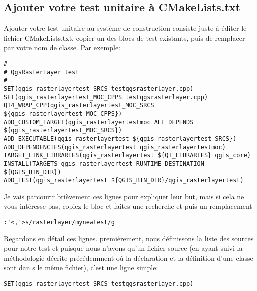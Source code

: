 \subsection{Ajouter votre test unitaire \`a CMakeLists.txt}
Ajouter votre test unitaire au syst\`eme de construction consiste juste \`a \'editer le fichier CMakeLists.txt, copier un des blocs de test existants, puis de remplacer par votre nom de classe. Par exemple:

\begin{verbatim}
#
# QgsRasterLayer test
#
SET(qgis_rasterlayertest_SRCS testqgsrasterlayer.cpp)
SET(qgis_rasterlayertest_MOC_CPPS testqgsrasterlayer.cpp)
QT4_WRAP_CPP(qgis_rasterlayertest_MOC_SRCS ${qgis_rasterlayertest_MOC_CPPS})
ADD_CUSTOM_TARGET(qgis_rasterlayertestmoc ALL DEPENDS ${qgis_rasterlayertest_MOC_SRCS})
ADD_EXECUTABLE(qgis_rasterlayertest ${qgis_rasterlayertest_SRCS})
ADD_DEPENDENCIES(qgis_rasterlayertest qgis_rasterlayertestmoc)
TARGET_LINK_LIBRARIES(qgis_rasterlayertest ${QT_LIBRARIES} qgis_core)
INSTALL(TARGETS qgis_rasterlayertest RUNTIME DESTINATION ${QGIS_BIN_DIR})
ADD_TEST(qgis_rasterlayertest ${QGIS_BIN_DIR}/qgis_rasterlayertest)
\end{verbatim}
Je vais parcourir bri\`evement ces lignes pour expliquer leur but, mais si cela ne vous int\'eresse pas, copiez le bloc et faites une recherche et puis un remplacement

\begin{verbatim}
:'<,'>s/rasterlayer/mynewtest/g
\end{verbatim}

Regardons en d\'etail ces lignes. premi\`erement, nous d\'efinissons la liste des sources pour notre test et puisque nous n'avons qu'un fichier source (en ayant suivi la m\'ethodologie d\'ecrite pr\'ec\'edemment o\`u la d\'eclaration et la d\'efinition d'une classe sont dan s le m\^eme fichier), c'est une ligne simple:

\begin{verbatim}
SET(qgis_rasterlayertest_SRCS testqgsrasterlayer.cpp)
\end{verbatim}

